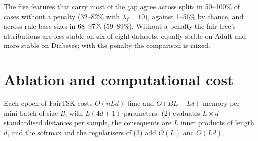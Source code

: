 \documentclass[pdflatex,sn-basic,Numbered]{sn-jnl}
\begin{document}
The five features that carry most of the gap agree across splits in 50--100\% of cases without a penalty (32--82\% with \(\lambda_f = 10\)), against 1--56\% by chance, and across rule-base sizes in 68--97\% (59--89\%). Without a penalty the fair tree's attributions are less stable on six of eight datasets, equally stable on Adult and more stable on Diabetes; with the penalty the comparison is mixed.

\hypertarget{ablation-and-computational-cost}{%
\section{Ablation and computational cost}\label{ablation-and-computational-cost}}

Each epoch of FairTSK costs \(O(nLd)\) time and \(O(BL + Ld)\) memory per mini-batch of size \(B\), with \(L(4d + 1)\) parameters: (2) evaluates \(L \times d\) standardised distances per sample, the consequents are \(L\) inner products of length \(d\), and the softmax and the regularisers of (3) add \(O(L)\) and \(O(Ld)\).
\end{document}
